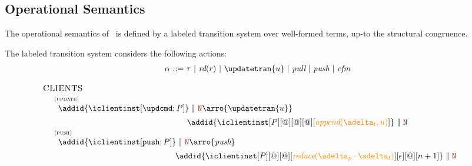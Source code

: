 \documentclass[envcountsect,runningheads,orivec]{llncs}
\begin{document}
\subsection{Operational Semantics}

The operational semantics of \gspcalculus\ is defined by a labeled transition system 
over well-formed terms, up-to the structural congruence.

The labeled transition system considers the following actions:
\[ 
\begin{array}{r@{\ ::= \ }l}
  \alpha & \tau \ | \ \readtran{r} \ | \  \updatetran{u} \ | \ \pulltran \ | \ \pushtran \ | \ \confirmedtran 
  \\
\end{array}
\]



 \[
 \begin{array}{l}
   \hspace{-.3cm} \textsc{CLIENTS}\\
%		
	\mathax{update}
		{\begin{array}{l}
		\addid{\iclientinst[\tupdateins]} \ \bigpar \ \isystemterm
		\arro{\updatetran{u}} 
		\\[5pt]
		\hspace{5.5cm}
		{\addid{\iclientinst[P][@][@][@][\iappend{\transactionbuffer}{u}]} \ \bigpar \   \isystemterm}
		\end{array}}
\\
	\mathax{push}
		{\begin{array}{l}
		\addid{\iclientinst[\tpushins]} \ \bigpar \ \isystemterm
		\arro{\pushtran} 
		\\[5pt]
		\hspace{5cm}
		{\addid{\iclientinst[P][@][@][\ireduce{\pushbuffer\cdot \transactionbuffer}][\epsilon][@][n+1]}\ \bigpar \ \isystemterm}
		\end{array}}
\\
	

\end{array}\]
\end{document}
